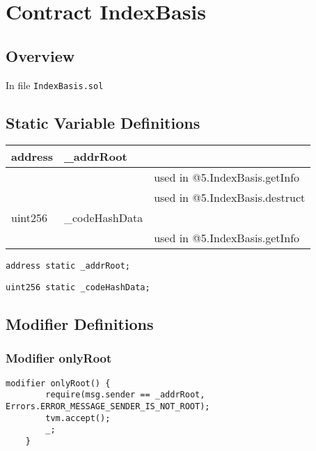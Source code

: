 
\chapter{Contract IndexBasis}

\minitoc

\section{Overview}


In file {\tt IndexBasis.sol}

\section{Static Variable Definitions}


\ifsoltables
\noindent\begin{tabular}{|l|l|p{5cm}|}\hline
address & \_{}addrRoot &  \\\hline
 & & used in @5.IndexBasis.getInfo\\\hline
 & & used in @5.IndexBasis.destruct\\\hline
uint256 & \_{}codeHashData &  \\\hline
 & & used in @5.IndexBasis.getInfo\\\hline
\end{tabular}
\fi


\begin{lstlisting}[firstnumber=9]
    address static _addrRoot;
\end{lstlisting}

\begin{lstlisting}[firstnumber=10]
    uint256 static _codeHashData;
\end{lstlisting}

\section{Modifier Definitions}


\subsection{Modifier onlyRoot}


\begin{lstlisting}[firstnumber=12]
    modifier onlyRoot() {
        require(msg.sender == _addrRoot, Errors.ERROR_MESSAGE_SENDER_IS_NOT_ROOT);
        tvm.accept();
        _;
    }
\end{lstlisting}

